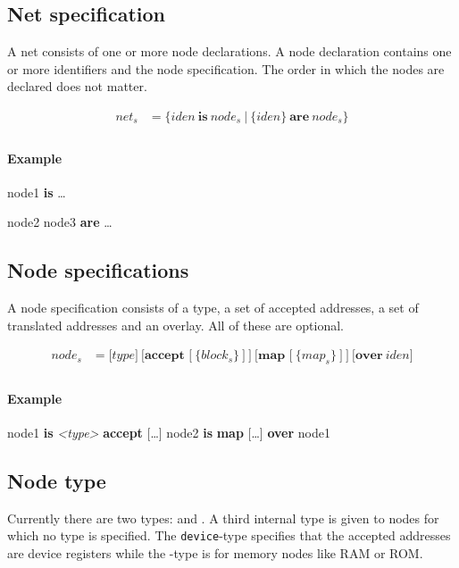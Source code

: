 \documentclass[a4paper,11pt,twoside]{report}
\begin{document}
{{{\subsection{Net specification}
A net consists of one or more node declarations.
A node declaration contains one or more identifiers and the node specification.
The order in which the nodes are declared does not matter.

\begin{align*}
\textit{net}_s & \mathop{=}
	\Big\{
		\textit{iden}\ \textbf{is}\ \textit{node}_s\
	\Big|\
		\bigl\{ \textit{iden}\bigr\}\ \textbf{are}\ \textit{node}_s
	\Big\} \\
\end{align*}

\paragraph{Example}
\begin{syntax}
	node1 \textbf{is} \ldots

	node2
	node3 \textbf{are} \ldots
\end{syntax}

\subsection{Node specifications}
A node specification consists of a type, a set of accepted addresses, a set of translated addresses and an overlay.
All of these are optional.

\begin{align*}
\textit{node}_s & \mathop{=}
	\Big[
		\textit{type}
	\Big]\ 	
	\Big[
		\textbf{accept [}\ \big\{\textit{block}_s\big\}\ \textbf{]}\ 
	\Big]\ 
	\Big[
		\textbf{map [}\ \big\{\textit{map}_s\big\}\ \textbf{]}\ 
	\Big]\ 
	\Big[
		\textbf{over}\ \textit{iden}
	\Big] \\
\end{align*}

\paragraph{Example}
\begin{syntax}
	node1 \textbf{is} \textit{<type>} \textbf{accept} [\ldots]
	node2 \textbf{is} \textbf{map} [\ldots] \textbf{over} node1
\end{syntax}

\subsection{Node type}
Currently there are two types:  and . A third internal type  is given to nodes for which no type is specified.
The \verb|device|-type specifies that the accepted addresses are device registers while the -type is for memory nodes like RAM or ROM.

}}}
\end{document}
